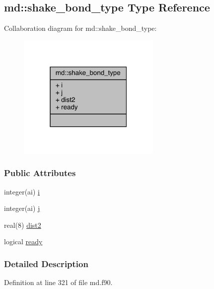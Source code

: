 \hypertarget{structmd_1_1shake__bond__type}{\subsection{md\-:\-:shake\-\_\-bond\-\_\-type Type Reference}
\label{structmd_1_1shake__bond__type}
}


Collaboration diagram for md\-:\-:shake\-\_\-bond\-\_\-type\-:
\nopagebreak
\begin{figure}[H]
\begin{center}
\leavevmode
\includegraphics[width=195pt]{structmd_1_1shake__bond__type__coll__graph}
\end{center}
\end{figure}
\subsubsection*{Public Attributes}
\begin{DoxyCompactItemize}
\item 
integer(ai) \hyperlink{structmd_1_1shake__bond__type_a4f4d13a5d1d345e84277578e94ed5168}{i}
\item 
integer(ai) \hyperlink{structmd_1_1shake__bond__type_ab09ad43829ab07471b613ba621958f19}{j}
\item 
real(8) \hyperlink{structmd_1_1shake__bond__type_a55ffab02eed2d26c09ee5871fd4a1201}{dist2}
\item 
logical \hyperlink{structmd_1_1shake__bond__type_a91f180f1235ac623cfb43e8a4d3c407d}{ready}
\end{DoxyCompactItemize}


\subsubsection{Detailed Description}


Definition at line 321 of file md.\-f90.



